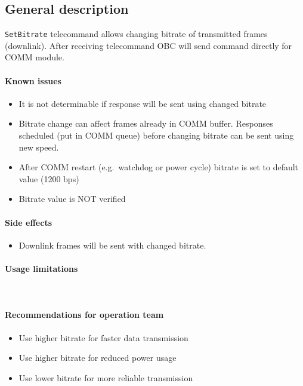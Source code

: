 

\subsection{General description}
\texttt{SetBitrate} telecommand allows changing bitrate of transmitted frames (downlink). After receiving telecommand OBC will send command directly for COMM module. 

\paragraph{Known issues}
\begin{itemize}
	\item It is not determinable if response will be sent using changed bitrate
	\item Bitrate change can affect frames already in COMM buffer. Responses scheduled (put in COMM queue) before changing bitrate can be sent using new speed.
	\item After COMM restart (e.g.\ watchdog or power cycle) bitrate is set to default value (1200 bps)
	\item Bitrate value is NOT verified
\end{itemize}

\paragraph{Side effects} 
\begin{itemize}
	\item Downlink frames will be sent with changed bitrate.
\end{itemize}

\paragraph{Usage limitations} \mbox{} \\
\None

\paragraph{Recommendations for operation team}
\begin{itemize}
	\item Use higher bitrate for faster data transmission
	\item Use higher bitrate for reduced power usage
	\item Use lower bitrate for more reliable transmission
\end{itemize}

